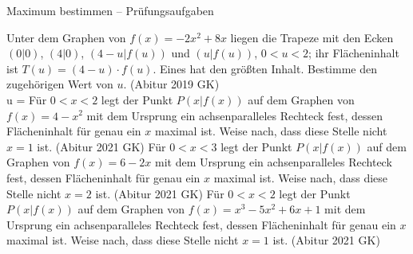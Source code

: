 \begin{aufgabe}{Maximum bestimmen – Prüfungsaufgaben}
\begin{teile}
\teil Unter dem Graphen von $f(x) = -2x^2 + 8x$ liegen die Trapeze mit den Ecken $(0 | 0)$, $(4 | 0)$, $(4 - u | f(u))$ und $(u | f(u))$, $0 < u < 2$; ihr Flächeninhalt ist $T(u) = (4 - u) \cdot f(u)$. Eines hat den größten Inhalt. Bestimme den zugehörigen Wert von $u$. \hfill (Abitur 2019 GK) \\ u = \leerfeld
\teil Für $0 < x < 2$ legt der Punkt $P(x | f(x))$ auf dem Graphen von $f(x) = 4 - x^2$ mit dem Ursprung ein achsenparalleles Rechteck fest, dessen Flächeninhalt für genau ein $x$ maximal ist. Weise nach, dass diese Stelle nicht $x = 1$ ist. \hfill (Abitur 2021 GK)
\teil Für $0 < x < 3$ legt der Punkt $P(x | f(x))$ auf dem Graphen von $f(x) = 6 - 2x$ mit dem Ursprung ein achsenparalleles Rechteck fest, dessen Flächeninhalt für genau ein $x$ maximal ist. Weise nach, dass diese Stelle nicht $x = 2$ ist. \hfill (Abitur 2021 GK)
\teil Für $0 < x < 2$ legt der Punkt $P(x | f(x))$ auf dem Graphen von $f(x) = x^3 - 5x^2 + 6x + 1$ mit dem Ursprung ein achsenparalleles Rechteck fest, dessen Flächeninhalt für genau ein $x$ maximal ist. Weise nach, dass diese Stelle nicht $x = 1$ ist. \hfill (Abitur 2021 GK)
\end{teile}
\end{aufgabe}
